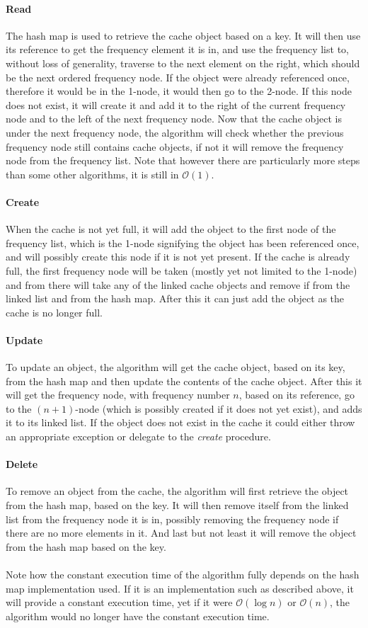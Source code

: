 \documentclass[pdftex,a4paper,12pt,twoside]{report}
\begin{document}
\paragraph{Read} The hash map is used to retrieve the cache object based on a key. It will then use its reference to get the frequency element it is in, and use the frequency list to, without loss of generality, traverse to the next element on the right, which should be the next ordered frequency node. If the object were already referenced once, therefore it would be in the 1-node, it would then go to the 2-node. If this node does not exist, it will create it and add it to the right of the current frequency node and to the left of the next frequency node. Now that the cache object is under the next frequency node, the algorithm will check whether the previous frequency node still contains cache objects, if not it will remove the frequency node from the frequency list. Note that however there are particularly more steps than some other algorithms, it is still in $\mathcal{O}(1)$.
\paragraph{Create} When the cache is not yet full, it will add the object to the first node of the frequency list, which is the 1-node signifying the object has been referenced once, and will possibly create this node if it is not yet present. If the cache is already full, the first frequency node will be taken (mostly yet not limited to the 1-node) and from there will take any of the linked cache objects and remove if from the linked list and from the hash map. After this it can just add the object as the cache is no longer full.
\paragraph{Update} To update an object, the algorithm will get the cache object, based on its key, from the hash map and then update the contents of the cache object. After this it will get the frequency node, with frequency number $n$, based on its reference, go to the $(n+1)$-node (which is possibly created if it does not yet exist), and adds it to its linked list. If the object does not exist in the cache it could either throw an appropriate exception or delegate to the \emph{create} procedure.
\paragraph{Delete} To remove an object from the cache, the algorithm will first retrieve the object from the hash map, based on the key. It will then remove itself from the linked list from the frequency node it is in, possibly removing the frequency node if there are no more elements in it. And last but not least it will remove the object from the hash map based on the key.
\\\\
Note how the constant execution time of the algorithm fully depends on the hash map implementation used. If it is an implementation such as described above, it will provide a constant execution time, yet if it were $\mathcal{O}(\log n)$ or $\mathcal{O}(n)$, the algorithm would no longer have the constant execution time.
\end{document}
